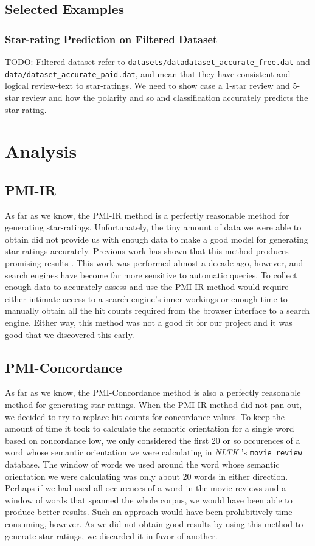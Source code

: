 \documentclass[11pt]{report} %
\begin{document}
\section{Selected Examples}
\subsection{Star-rating Prediction on Filtered Dataset}
TODO: Filtered dataset refer to \verb|datasets/datadataset_accurate_free.dat| and \verb|data/dataset_accurate_paid.dat|, and mean that they have consistent and logical review-text to star-ratings. We need to show case a 1-star review and 5-star review and how the polarity and so and classification accurately predicts the star rating.

\chapter{Analysis}
	\section{PMI-IR}

As far as we know, the PMI-IR method is a perfectly reasonable method for generating star-ratings. Unfortunately, the tiny amount of data we were able to obtain did not provide us with enough data to make a good model for generating star-ratings accurately. Previous work has shown that this method produces promising results \cite{Turney2001}. This work was performed almost a decade ago, however, and search engines have become far more sensitive to automatic queries. To collect enough data to accurately assess and use the PMI-IR method would require either intimate access to a search engine's inner workings or enough time to manually obtain all the hit counts required from the browser interface to a search engine. Either way, this method was not a good fit for our project and it was good that we discovered this early.

	\section{PMI-Concordance}

As far as we know, the PMI-Concordance method is also a perfectly reasonable method for generating star-ratings. When the PMI-IR method did not pan out, we decided to try to replace hit counts for concordance values. To keep the amount of time it took to calculate the semantic orientation for a single word based on concordance low, we only considered the first 20 or so occurences of a word whose semantic orientation we were calculating in \textit{NLTK} 's \verb|movie_review| database. The window of words we used around the word whose semantic orientation we were calculating was only about 20 words in either direction. Perhaps if we had used all occurences of a word in the movie reviews and a window of words that spanned the whole corpus, we would have been able to produce better results. Such an approach would have been prohibitively time-consuming, however. As we did not obtain good results by using this method to generate star-ratings, we discarded it in favor of another. 
\end{document}
